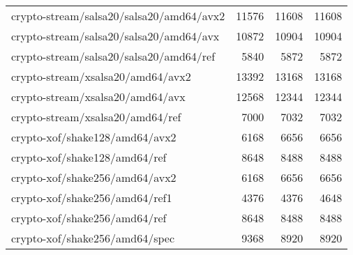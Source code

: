 \begin{table}
\begin{tabular}{lrrr}
crypto-stream/salsa20/salsa20/amd64/avx2 &
11576 &
11608 &
11608\\ 


crypto-stream/salsa20/salsa20/amd64/avx &
10872 &
10904 &
10904\\ 


crypto-stream/salsa20/salsa20/amd64/ref &
5840 &
5872 &
5872\\ 


crypto-stream/xsalsa20/amd64/avx2 &
13392 &
13168 &
13168\\ 


crypto-stream/xsalsa20/amd64/avx &
12568 &
12344 &
12344\\ 


crypto-stream/xsalsa20/amd64/ref &
7000 &
7032 &
7032\\ 


crypto-xof/shake128/amd64/avx2 &
6168 &
6656 &
6656\\ 


crypto-xof/shake128/amd64/ref &
8648 &
8488 &
8488\\ 


crypto-xof/shake256/amd64/avx2 &
6168 &
6656 &
6656\\ 


crypto-xof/shake256/amd64/ref1 &
4376 &
4376 &
4648\\ 


crypto-xof/shake256/amd64/ref &
8648 &
8488 &
8488\\ 


crypto-xof/shake256/amd64/spec &
9368 &
8920 &
8920\\

  \bottomrule
  \end{tabular}
\end{table}

